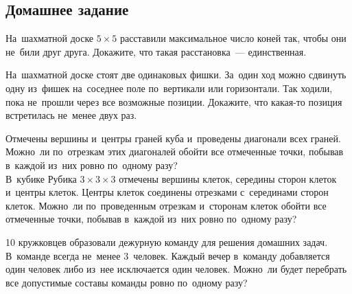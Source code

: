 

\subsection*{Домашнее задание}



\begin{problems}

\item
На~шахматной доске $5 \times 5$ расставили максимальное число коней так, чтобы
они не~били друг друга.
Докажите, что такая расстановка~— единственная.

\item
На~шахматной доске стоят две одинаковых фишки.
За~один ход можно сдвинуть одну из~фишек на~соседнее поле по~вертикали или
горизонтали.
Так ходили, пока не~прошли через все возможные позиции.
Докажите, что какая-то позиция встретилась не~менее двух раз.

\item
\subproblem
Отмечены вершины и~центры граней куба и~проведены диагонали всех граней.
Можно~ли по~отрезкам этих диагоналей обойти все отмеченные точки, побывав
в~каждой из~них ровно по~одному разу?
\\
\subproblem
В~кубике Рубика $3 \times 3 \times 3$ отмечены вершины клеток, середины сторон
клеток и~центры клеток.
Центры клеток соединены отрезками с~серединами сторон клеток.
Можно~ли по~проведенным отрезкам и~сторонам клеток обойти все отмеченные точки,
побывав в~каждой из~них ровно по~одному разу?


\item
10 кружковцев образовали дежурную команду для решения домашних задач.
В~команде всегда не~менее 3~человек.
Каждый вечер в~команду добавляется один человек либо из~нее исключается один
человек.
Можно~ли будет перебрать все допустимые составы команды ровно по~одному разу?

\end{problems}

